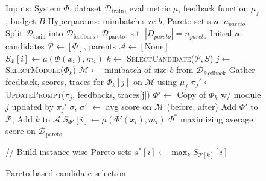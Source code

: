 \begin{figure}[t]
\centering
\begin{minipage}[t]{0.55\textwidth}
    \begin{algorithm}[H]
    \caption{GEPA: Reflective Evolutionary Prompt Optimizer}
    \label{alg:gepa_optimizer}
    \begin{algorithmic}[1]
    \small
    \Require Inputs: System $\Phi$, dataset $\mathcal{D}_{\text{train}}$, eval metric $\mu$, feedback function $\mu_f$, budget $B$
    \Require Hyperparams: minibatch size $b$, Pareto set size $n_{pareto}$
    \State Split $\mathcal{D}_{\text{train}}$ into $\mathcal{D}_{\text{feedback}}$, $\mathcal{D}_{\text{pareto}}$, s.t. $|D_{pareto}| = n_{pareto}$
    \State Initialize candidates $\mathcal{P} \gets [\Phi]$, parents $\mathcal{A} \gets [\text{None}]$
        \State $S_{\Phi}[i] \gets \mu(\Phi(x_i), m_i)$
    \EndFor
        \State $k \gets$ \textsc{SelectCandidate}($\mathcal{P}, S$)
        \State $j \gets$ \textsc{SelectModule}($\Phi_k$)
        \State $\mathcal{M} \gets$ minibatch of size $b$ from $\mathcal{D}_{\text{feedback}}$
        \State Gather feedback, scores, traces for $\Phi_k[j]$ on $\mathcal{M}$ using $\mu_f$
        \State $\pi_j' \gets$ \textsc{UpdatePrompt}($\pi_j$, feedbacks, traces[j])
        \State $\Phi' \gets$ Copy of $\Phi_k$ w/ module $j$ updated by $\pi_j'$
        \State $\sigma$, $\sigma'$ $\gets$ avg score on $\mathcal{M}$ (before, after)
            \State Add $\Phi'$ to $\mathcal{P}$; Add $k$ to $\mathcal{A}$
                \State $S_{\Phi'}[i] \gets \mu(\Phi'(x_i), m_i)$
            \EndFor
        \EndIf
    \EndWhile
    \State \Return $\Phi^*$ maximizing average score on $\mathcal{D}_{\text{pareto}}$
    \end{algorithmic}
    \end{algorithm}
\end{minipage}%
\hfill
\begin{minipage}[t]{0.44\textwidth}
    \begin{algorithm}[H]
    \caption{Pareto-based candidate selection}
    \label{alg:select_candidate}
    \begin{algorithmic}[1]
    \small
        \State // Build instance-wise Pareto sets
            \State $s^*[i] \gets \max_{k} S_{\mathcal{P}[k]}[i]$

\end{algorithmic}
\end{algorithm}
\end{minipage}
\end{figure}
